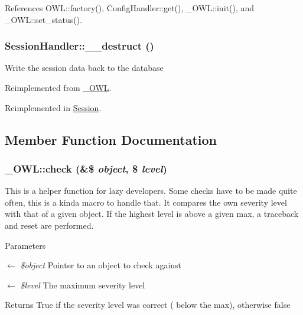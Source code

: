 References OWL::factory(), ConfigHandler::get(), \_\-OWL::init(), and \_\-OWL::set\_\-status().

\subsubsection[{\_\-\_\-destruct}]{\setlength{\rightskip}{0pt plus 5cm}SessionHandler::\_\-\_\-destruct ()}\label{classSessionHandler_a461097c3ee6b1aecf833ce1225d02329}
Write the session data back to the database 

Reimplemented from \hyperlink{class__OWL_a44fd2222476a3109286cc82d92b6bbcc}{\_\-OWL}.



Reimplemented in \hyperlink{classSession_aa498272c85524e4700abc3363883165b}{Session}.



\subsection{Member Function Documentation}
\subsubsection[{check}]{\setlength{\rightskip}{0pt plus 5cm}\_\-OWL::check (\&\$ {\em object}, \/  \$ {\em level})}\label{class__OWL_ad6f4f6946f40199dd0333cf219fa500e}
This is a helper function for lazy developers. Some checks have to be made quite often, this is a kinda macro to handle that. It compares the own severity level with that of a given object. If the highest level is above a given max, a traceback and reset are performed.


\begin{DoxyParams}{Parameters}
\item[\mbox{$\leftarrow$} {\em \$object}]Pointer to an object to check against \item[\mbox{$\leftarrow$} {\em \$level}]The maximum severity level \end{DoxyParams}
\begin{DoxyReturn}{Returns}
True if the severity level was correct ( below the max), otherwise false 
\end{DoxyReturn}



